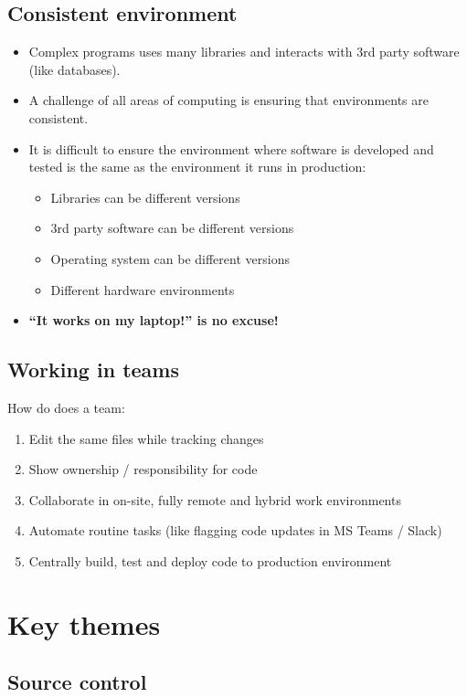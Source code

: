 \documentclass[slides]{pgnotes}
\begin{document}
\subsection{Consistent environment}

\begin{itemize}
\item Complex programs uses many libraries and interacts with 3rd party software (like databases).
\item A challenge of all areas of computing is ensuring that environments are consistent.
\item It is difficult to ensure the environment where software is developed and tested is the same as the environment it runs in production:
  \begin{itemize}
  \item Libraries can be different versions
  \item 3rd party software can be different versions
  \item Operating system can be different versions
  \item Different hardware environments
  \end{itemize}
\item \textbf{``It works on my laptop!'' is no excuse!}
\end{itemize}

\subsection{Working in teams}

How do does a team:
\begin{enumerate}
\item Edit the same files while tracking changes
\item Show ownership / responsibility for code
\item Collaborate in on-site, fully remote and hybrid work environments
\item Automate routine tasks (like flagging code updates in MS Teams / Slack)
\item Centrally build, test and deploy code to production environment  
\end{enumerate}

\section{Key themes}

\subsection{Source control}
\end{document}
